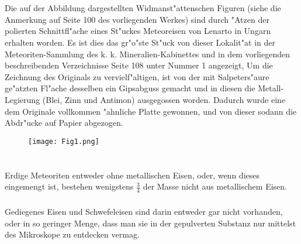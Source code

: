 \documentclass[a4paper, 11pt, oneside, polutonikogreek, german]{article}
\begin{document}
\section{}
\paragraph{}
Die auf der Abbildung dargestellten Widmanst"attenschen Figuren (siehe die Anmerkung auf Seite 100 des vorliegenden Werkes) sind durch "Atzen der polierten Schnittfl"ache eines St"uckes Meteoreisen von Lenarto in Ungarn erhalten worden. Es ist dies das gr"o"ste St"uck von dieser Lokalit"at in der Meteoriten-Sammlung des k. k. Mineralien-Kabinettes und in dem vorliegenden beschreibenden Verzeichnisse Seite 108 unter Nummer 1 angezeigt, Um die Zeichnung des Originals zu vervielf"altigen, ist von der mit Salpeters"aure ge"atzten Fl"ache desselben ein Gipsabguss gemacht und in diesen die Metall-Legierung (Blei, Zinn und Antimon) ausgegossen worden. Dadurch wurde eine dem Originale vollkommen "ahnliche Platte gewonnen, und von dieser sodann die Abdr"ucke auf Papier abgezogen.
\clearpage
\begin{figure}[b]
\centering
\texttt{[image: Fig1.png]}
\end{figure}
\clearpage
\section{}
\subsection{}
\paragraph{}
Erdige Meteoriten entweder ohne metallischen Eisen, oder, wenn dieses eingemengt ist, bestehen wenigstens $\frac{3}{4}$ der Masse nicht aus metallischem Eisen.
\subsubsection{}
\paragraph{}
Gediegenes Eisen und Schwefeleisen sind darin entweder gar nicht vorhanden, oder in so geringer Menge, dass man sie in der gepulverten Substanz nur mittelst des Mikroskope zu entdecken vermag.
\end{document}

